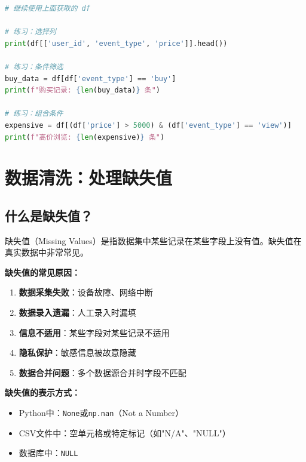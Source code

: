\documentclass[12pt,a4paper]{article}
\begin{document}
\begin{practicebox}
\begin{lstlisting}[language=Python]
# 继续使用上面获取的 df

# 练习：选择列
print(df[['user_id', 'event_type', 'price']].head())

# 练习：条件筛选
buy_data = df[df['event_type'] == 'buy']
print(f"购买记录: {len(buy_data)} 条")

# 练习：组合条件
expensive = df[(df['price'] > 5000) & (df['event_type'] == 'view')]
print(f"高价浏览: {len(expensive)} 条")
\end{lstlisting}
\end{practicebox}

\section{数据清洗：处理缺失值}

\subsection{什么是缺失值？}

\begin{theorybox}[缺失值的产生原因]
缺失值（Missing Values）是指数据集中某些记录在某些字段上没有值。缺失值在真实数据中非常常见。

\textbf{缺失值的常见原因：}
\begin{enumerate}
    \item \textbf{数据采集失败}：设备故障、网络中断
    \item \textbf{数据录入遗漏}：人工录入时漏填
    \item \textbf{信息不适用}：某些字段对某些记录不适用
    \item \textbf{隐私保护}：敏感信息被故意隐藏
    \item \textbf{数据合并问题}：多个数据源合并时字段不匹配
\end{enumerate}

\textbf{缺失值的表示方式：}
\begin{itemize}
    \item Python中：\texttt{None}或\texttt{np.nan}（Not a Number）
    \item CSV文件中：空单元格或特定标记（如"N/A"、"NULL"）
    \item 数据库中：\texttt{NULL}
\end{itemize}
\end{theorybox}
\end{document}
